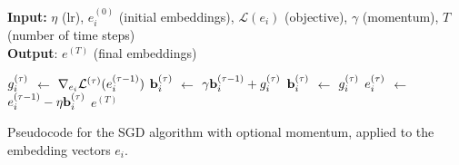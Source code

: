 \begin{algorithm}[H]
    \small
    \textbf{Input:}
    $\eta$ (lr), $e_i^{(0)}$ (initial embeddings),
    $\mathcal{L}(e_i)$ (objective), $\gamma$ (momentum), $T$ (number of time steps) \\
    \textbf{Output}: $e^{(T)}$ (final embeddings)
    \begin{algorithmic}[1]
                \State $g_i^{(\tau)}$ $\gets$ $\nabla_{e_i} \mathcal{L}^{(\tau)} (e_i^{(\tau-1)})$
                    \State $\mathbf{b}_i^{(\tau)}$ $\gets$ $\gamma \mathbf{b}_i^{(\tau-1)} + g_i^{(\tau)}$
                \Else
                    \State $\mathbf{b}_i^{(\tau)}$ $\gets$ $g_i^{(\tau)}$
                \EndIf
                \State $e_i^{(\tau)}$ $\gets$ $e_i^{(\tau-1)} - \eta \mathbf{b}_i^{(\tau)}$
            \EndFor
        \EndFor
        \vspace*{1.0ex}
        \State \Return $e^{(T)}$
    \end{algorithmic}
    \caption{Pseudocode for the SGD algorithm with optional momentum, applied to the embedding vectors $e_i$.}
    \label{alg:algorithm_sgd}
\end{algorithm}
